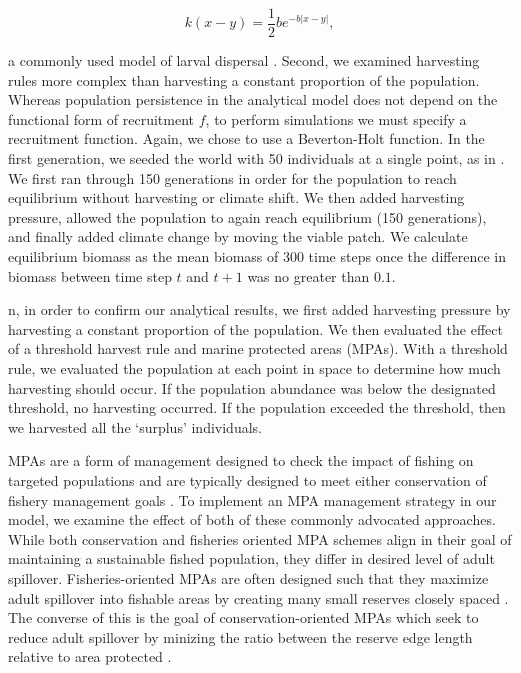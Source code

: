 \documentclass[12pt,english]{article}
\begin{document}
\begin{spacing}{1.9}
\begin{flushleft}
\[ k(x-y)=\frac{1}{2}be^{-b|x-y|},\]

\noindent a commonly used model of larval dispersal \citep{Pinsky:2011fk}.  Second, we examined harvesting rules more complex than harvesting a constant proportion of the population. Whereas population persistence in the analytical model does not depend on the functional form of recruitment $f$, to perform simulations we must specify a recruitment function.  Again, we chose to use a Beverton-Holt function.  In the first generation, we seeded the world with 50 individuals at a single point, as in \cite{ZhouKot2011}. We first ran through 150 generations in order for the population to reach equilibrium without harvesting or climate shift.  We then added harvesting pressure, allowed the population to again reach equilibrium (150 generations), and finally added climate change by moving the viable patch.  We calculate equilibrium biomass as the mean biomass of 300 time steps once the difference in biomass between time step $t$ and $t+1$ was no greater than $0.1$.  

n, in order to confirm our analytical results, we first added harvesting pressure by harvesting a constant proportion of the population. We then evaluated the effect of a threshold harvest rule and marine protected areas (MPAs).  With a threshold rule, we evaluated the population at each point in space to determine how much harvesting should occur. If the population abundance was below the designated threshold, no harvesting occurred. If the population exceeded the threshold, then we harvested all the `surplus' individuals.

MPAs are a form of management designed to check the impact of fishing on targeted populations and are typically designed to meet either conservation of fishery management goals \citep{Agardy1994, HollandBrazee1996, Gainesetal2010a}. To implement an MPA management strategy in our model, we examine the effect of both of these commonly advocated approaches. While both conservation and fisheries oriented MPA schemes align in their goal of maintaining a sustainable fished population, they differ in desired level of adult spillover. Fisheries-oriented MPAs are often designed such that they maximize adult spillover into fishable areas by creating many small reserves closely spaced \citep{HastingsBotsford2003}. The converse of this is the goal of conservation-oriented MPAs which seek to reduce adult spillover by minizing the ratio between the reserve edge length relative to area protected \citep{Gainesetal2010a}. 


\end{flushleft}
\end{spacing}
\end{document}
